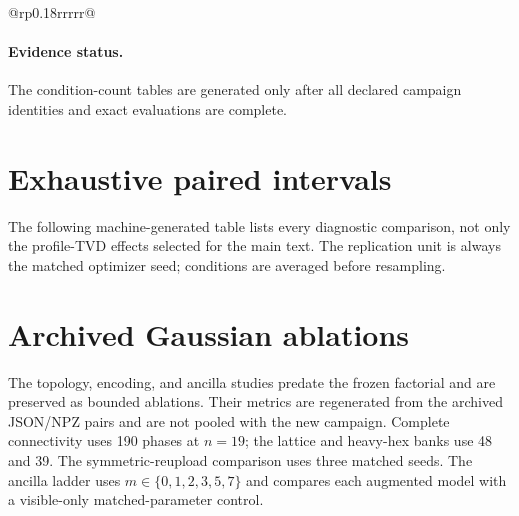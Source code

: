 \label{tab:condition-count-per-condition}
\tablelasttail{\bottomrule}
\begin{supertabular}{@{}rp{0.18\textwidth}rrrrr@{}}
\end{supertabular}
\else

\paragraph{Evidence status.}
The condition-count tables are generated only after all declared campaign
identities and exact evaluations are complete.

\fi

\section{Exhaustive paired intervals}

The following machine-generated table lists every diagnostic comparison, not
only the profile-TVD effects selected for the main text.  The replication unit
is always the matched optimizer seed; conditions are averaged before
resampling.

\clearpage

\section{Archived Gaussian ablations}
\label{app:ablations}

The topology, encoding, and ancilla studies predate the frozen factorial and
are preserved as bounded ablations.  Their metrics are regenerated from the
archived JSON/NPZ pairs and are not pooled with the new campaign.  Complete
connectivity uses 190 phases at $n=19$; the lattice and heavy-hex banks use 48
and 39.  The symmetric-reupload comparison uses three matched seeds.  The
ancilla ladder uses $m\in\{0,1,2,3,5,7\}$ and compares each augmented model
with a visible-only matched-parameter control.

